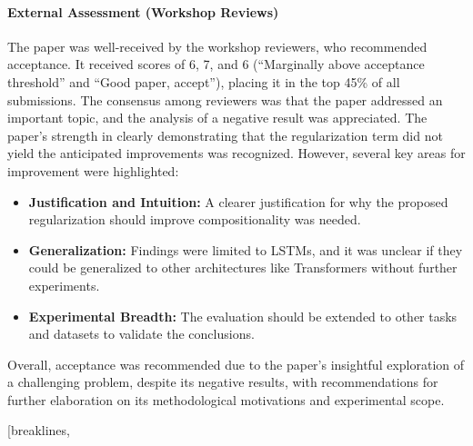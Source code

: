 \begin{appendices}
\paragraph{External Assessment (Workshop Reviews)}
The paper was well-received by the workshop reviewers, who recommended acceptance. It received scores of 6, 7, and 6 (``Marginally above acceptance threshold'' and ``Good paper, accept''), placing it in the top 45\% of all submissions. The consensus among reviewers was that the paper addressed an important topic, and the analysis of a negative result was appreciated. The paper's strength in clearly demonstrating that the regularization term did not yield the anticipated improvements was recognized. However, several key areas for improvement were highlighted:
\begin{itemize}
\item \textbf{Justification and Intuition:} A clearer justification for why the proposed regularization should improve compositionality was needed.
\item \textbf{Generalization:} Findings were limited to LSTMs, and it was unclear if they could be generalized to other architectures like Transformers without further experiments.
\item \textbf{Experimental Breadth:} The evaluation should be extended to other tasks and datasets to validate the conclusions.
\end{itemize}
Overall, acceptance was recommended due to the paper's insightful exploration of a challenging problem, despite its negative results, with recommendations for further elaboration on its methodological motivations and experimental scope.

\begin{tcolorbox}[
  breakable,
  colback  = green!5!white,
  colframe = green!75!black,
  title    = {\small Reviewer \#1:
              A good paper analysing the effectiveness of a compositional
              regularisation term for LSTMs},
  fontupper=\scriptsize\ttfamily,
]
\end{tcolorbox}


\begin{tcolorbox}[
  breakable,
  colback  = green!5!white,
  colframe = green!75!black,
  title    = {\small Reviewer \#2: Compositional Regularization: Unexpected Obstacles in Enhancing Neural Network Generalization},
  fontupper=\scriptsize\ttfamily,
]
\VerbatimInput[breaklines,


\end{tcolorbox}
\end{appendices}
